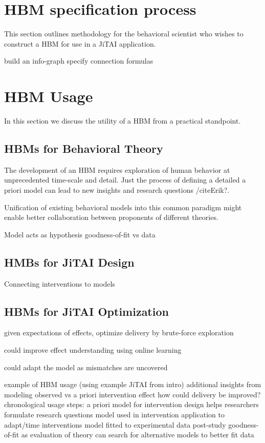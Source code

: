 \documentclass[runningheads,a4paper]{llncs}
\begin{document}
\section{HBM specification process}
This section outlines methodology for the behavioral scientist who wishes to construct a HBM for use in a JiTAI application.


build an info-graph
specify connection formulas

\section{HBM Usage}
In this section we discuss the utility of a HBM from a practical standpoint.

\subsection{HBMs for Behavioral Theory}
The development of an HBM requires exploration of human behavior at unprecedented time-scale and detail.
Just the process of defining a detailed a priori model can lead to new insights and research questions /cite{Erik?}.

Unification of existing behavioral models into this common paradigm might enable better collaboration between proponents of different theories.

Model acts as hypothesis
goodness-of-fit vs data

\subsection{HMBs for JiTAI Design}
Connecting interventions to models

\subsection{HBMs for JiTAI Optimization}
given expectations of effects, optimize delivery by brute-force exploration

could improve effect understanding using online learning

could adapt the model as mismatches are uncovered



example of HBM usage (using example JiTAI from intro)
additional insights from modeling
observed vs a priori intervention effect
how could delivery be improved?
chronological usage steps:
a priori model for intervention design
helps researchers formulate research questions
model used in intervention application 
to adapt/time interventions
model fitted to experimental data post-study
goodness-of-fit as evaluation of theory
can search for alternative models to better fit data
\end{document}
